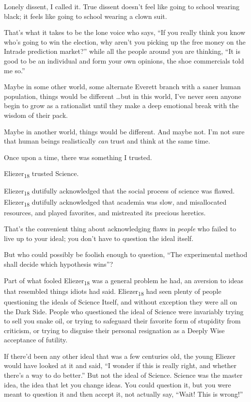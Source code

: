 {
 Lonely dissent, I called it. True dissent doesn't
feel like going to school wearing black; it feels like going to school
wearing a clown suit.}

{
 That's what it takes to be the lone voice who
says, ``If you really think you know
who's going to win the election, why
aren't you picking up the free money on the Intrade
prediction market?'' while all the people around you
are thinking, ``It is good to be an individual and
form your own opinions, the shoe commercials told me
so.''}

{
 Maybe in some other world, some alternate Everett branch with a
saner human population, things would be different \ldots but in this
world, I've never seen anyone begin to grow as a
rationalist until they make a deep emotional break with the wisdom of
their pack.}

{
 Maybe in another world, things would be different. And maybe not.
I'm not sure that human beings realistically
\textit{can} trust and think at the same time.}

{
 Once upon a time, there was something I trusted.}

{
 Eliezer\textsubscript{18} trusted Science.}

{
 Eliezer\textsubscript{18} dutifully acknowledged that the social
process of science was flawed. Eliezer\textsubscript{18} dutifully
acknowledged that academia was slow, and misallocated resources, and
played favorites, and mistreated its precious heretics.}

{
 That's the convenient thing about acknowledging
flaws in \textit{people} who failed to live up to your ideal; you
don't have to question the ideal itself.}

{
 But who could possibly be foolish enough to question,
``The experimental method shall decide which
hypothesis wins''?}

{
 Part of what fooled Eliezer\textsubscript{18} was a general
problem he had, an aversion to ideas that resembled things idiots had
said. Eliezer\textsubscript{18} had seen plenty of people questioning
the ideals of Science Itself, and without exception they were all on
the Dark Side. People who questioned the ideal of Science were
invariably trying to sell you snake oil, or trying to safeguard their
favorite form of stupidity from criticism, or trying to disguise their
personal resignation as a Deeply Wise acceptance of futility.}

{
 If there'd been any other ideal that was a few
centuries old, the young Eliezer would have looked at it and said,
``I wonder if this is really right, and whether
there's a way to do better.'' But not
the ideal of Science. Science was the master idea, the idea that let
you change ideas. You could question it, but you were meant to question
it and then accept it, not actually say, ``Wait! This
is wrong!''}

